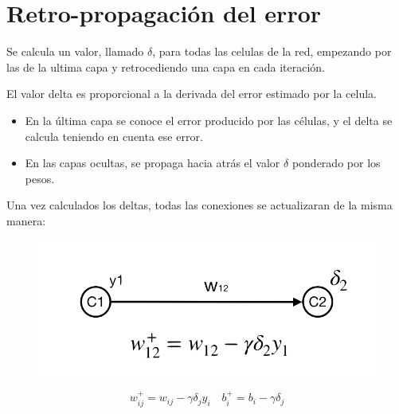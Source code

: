\documentclass[12pt, twoside, openright]{report} %
\begin{document}
\section{Retro-propagación del error}
Se calcula un valor, llamado $\delta$, para todas las celulas de la red, empezando por las de la ultima capa y retrocediendo una capa en cada iteración.

El valor delta es proporcional a la derivada del error estimado por la celula.
\begin{itemize}
	\item En la última capa se conoce el error producido por las células, y el delta se calcula teniendo en cuenta ese error.
	\item En las capas ocultas, se propaga hacia atrás el valor $\delta$ ponderado por los pesos.
\end{itemize}
\pagebreak

Una vez calculados los deltas, todas las conexiones se actualizaran de la misma manera: 
\begin{figure}[H]
	{\includegraphics[scale=.35]{regla-delta.jpg}}
\end{figure}
$$w^+_{ij} = w_{ij}-\gamma \delta_j y_i \quad b^+_{i}=b_i - \gamma \delta_j$$
\end{document}
